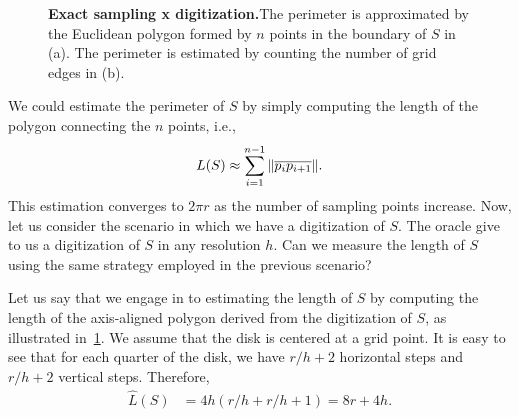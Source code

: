\begin{figure}
{}\hspace{1em}
\caption{\textbf{Exact sampling x digitization.}The perimeter is approximated by the Euclidean polygon formed by $n$ points in the boundary of $S$ in (a). The perimeter is estimated by counting the number of grid edges in (b).}
\label{ch5:fig:exact-sampling-digitization}
\end{figure}

We could estimate the perimeter of $S$ by simply computing the length of the polygon  connecting the $n$ points, i.e., 
\begin{align*}
	L(S) \approx \sum_{i=1}^{n-1}{ \lVert \overline{p_ip_{i+1}} \rVert}.
\end{align*}
This estimation converges to $2\pi r$ as the number of sampling points increase. Now, let us consider the scenario in which we have a digitization of $S$. The oracle give to us a digitization of $S$ in any resolution $h$. Can we measure the length of $S$ using the same strategy employed in the previous scenario?

Let us say that we engage in to estimating the length of $S$ by computing the length of the axis-aligned polygon derived from the digitization of $S$, as illustrated in~\cref{ch5:fig:exact-sampling-digitization}. We assume that the disk is centered at a grid point. It is easy to see that for each quarter of the disk, we have $r/h + 2$ horizontal steps and $r/h + 2$ vertical steps. Therefore,
\begin{align*}
	\hat{L}(S) &= 4h(r/h + r/h + 1) = 8r + 4h.
\end{align*}


